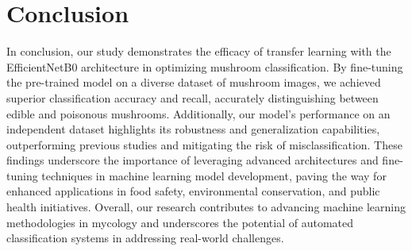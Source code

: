 \section{Conclusion}
In conclusion, our study demonstrates the efficacy of transfer learning with the EfficientNetB0 architecture in optimizing mushroom classification. By fine-tuning the pre-trained model on a diverse dataset of mushroom images, we achieved superior classification accuracy and recall, accurately distinguishing between edible and poisonous mushrooms. Additionally, our model's performance on an independent dataset highlights its robustness and generalization capabilities, outperforming previous studies and mitigating the risk of misclassification. These findings underscore the importance of leveraging advanced architectures and fine-tuning techniques in machine learning model development, paving the way for enhanced applications in food safety, environmental conservation, and public health initiatives. Overall, our research contributes to advancing machine learning methodologies in mycology and underscores the potential of automated classification systems in addressing real-world challenges.






